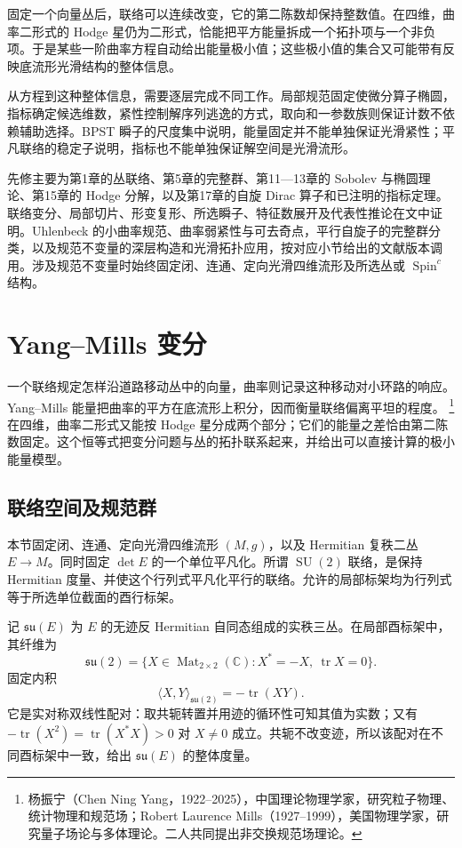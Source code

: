 固定一个向量丛后，联络可以连续改变，它的第二陈数却保持整数值。在四维，曲率二形式的 Hodge 星仍为二形式，恰能把平方能量拆成一个拓扑项与一个非负项。于是某些一阶曲率方程自动给出能量极小值；这些极小值的集合又可能带有反映底流形光滑结构的整体信息。

\ProseParagraphBreak
从方程到这种整体信息，需要逐层完成不同工作。局部规范固定使微分算子椭圆，指标确定候选维数，紧性控制解序列逃逸的方式，取向和一参数族则保证计数不依赖辅助选择。BPST 瞬子的尺度集中说明，能量固定并不能单独保证光滑紧性；平凡联络的稳定子说明，指标也不能单独保证解空间是光滑流形。

\ProseParagraphBreak
先修主要为第1章的丛联络、第5章的完整群、第11—13章的 Sobolev 与椭圆理论、第15章的 Hodge 分解，以及第17章的自旋 Dirac 算子和已注明的指标定理。联络变分、局部切片、形变复形、所选瞬子、特征数展开及代表性推论在文中证明。Uhlenbeck 的小曲率规范、曲率弱紧性与可去奇点，平行自旋子的完整群分类，以及规范不变量的深层构造和光滑拓扑应用，按对应小节给出的文献版本调用。涉及规范不变量时始终固定闭、连通、定向光滑四维流形及所选丛或 \(\operatorname{Spin}^c\) 结构。

\section{Yang–Mills 变分}
\label{g3:sec:B01}

一个联络规定怎样沿道路移动丛中的向量，曲率则记录这种移动对小环路的响应。Yang--Mills 能量把曲率的平方在底流形上积分，因而衡量联络偏离平坦的程度。%
\footnote{杨振宁（Chen Ning Yang，1922--2025），中国理论物理学家，研究粒子物理、统计物理和规范场；Robert Laurence Mills（1927--1999），美国物理学家，研究量子场论与多体理论。二人共同提出非交换规范场理论。}
在四维，曲率二形式又能按 Hodge 星分成两个部分；它们的能量之差恰由第二陈数固定。这个恒等式把变分问题与丛的拓扑联系起来，并给出可以直接计算的极小能量模型。

\subsection{联络空间及规范群}
\label{g3:subsec:B01:01}

本节固定闭、连通、定向光滑四维流形 \((M,g)\)，以及 Hermitian 复秩二丛 \(E\to M\)。同时固定 \(\det E\) 的一个单位平凡化。所谓 \(\operatorname{SU}(2)\) 联络，是保持 Hermitian 度量、并使这个行列式平凡化平行的联络。允许的局部标架均为行列式等于所选单位截面的酉行标架。

\ProseParagraphBreak
记 \(\mathfrak{su}(E)\) 为 \(E\) 的无迹反 Hermitian 自同态组成的实秩三丛。在局部酉标架中，其纤维为
\[
	\mathfrak{su}(2)=\{X\in\operatorname{Mat}_{2\times2}(\mathbb C):
	     X^*=-X,\ \operatorname{tr}X=0\}.
\]
固定内积
\begin{equation}\label{g3:eq:B-adjoint-inner-product}
	\langle X,Y\rangle_{\mathfrak{su}(2)}
	=-\operatorname{tr}(XY).
\end{equation}
它是实对称双线性配对：取共轭转置并用迹的循环性可知其值为实数；又有
\(-\operatorname{tr}(X^2)=\operatorname{tr}(X^*X)>0\) 对 \(X\ne0\) 成立。共轭不改变迹，所以该配对在不同酉标架中一致，给出 \(\mathfrak{su}(E)\) 的整体度量。

